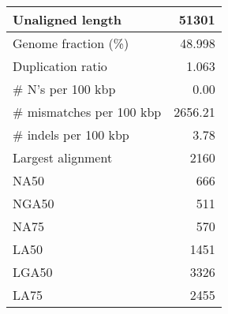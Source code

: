 \documentclass[12pt,a4paper]{article}
\begin{document}
\begin{table}[ht]
\begin{center}
\begin{tabular}{|l*{1}{|r}|}
Unaligned length & 51301 \\ \hline
Genome fraction (\%) & 48.998 \\ \hline
Duplication ratio & 1.063 \\ \hline
\# N's per 100 kbp & 0.00 \\ \hline
\# mismatches per 100 kbp & 2656.21 \\ \hline
\# indels per 100 kbp & 3.78 \\ \hline
Largest alignment & 2160 \\ \hline
NA50 & 666 \\ \hline
NGA50 & 511 \\ \hline
NA75 & 570 \\ \hline
LA50 & 1451 \\ \hline
LGA50 & 3326 \\ \hline
LA75 & 2455 \\ \hline
\end{tabular}
\end{center}
\end{table}
\end{document}

